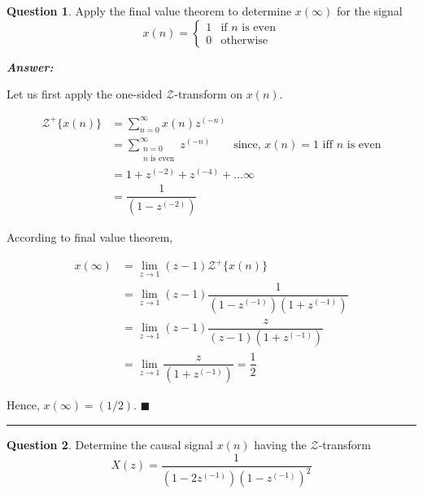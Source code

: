 \documentclass[12pt]{article}
\theoremstyle{definition}
\newtheorem{question}{Question}
\newenvironment{answer}{
    \textbf{\textit{Answer:}} \qquad
}{\hfill $\blacksquare$ \\ 

\begin{center}
    \rule{0.8\linewidth}{1.5px} 
    \vspace*{1cm}   
\end{center}
}
\newcommand{\zcal}{\mathcal{Z}}
\newcommand{\inv}[1][1]{^{(- #1)}}
\begin{document}

\begin{question}
    Apply the final value theorem to determine $x(\infty)$ for the signal 
    $$x(n) = \begin{cases}
        1 & \text{if } n \text{ is even}\\
        0 & \text{otherwise}
    \end{cases}$$
\end{question}

\begin{answer}
    Let us first apply the one-sided $\zcal$-transform on $x(n)$.

    \begin{align*}
        \zcal^+\{ x(n) \}
        & = \sum_{n = 0}^\infty x(n) z\inv[n]\\
        & = \sum_{\substack{n = 0 \\ n \text{ is even}}}^\infty z\inv[n] \qquad \text{since, } x(n) = 1 \text{ iff } n \text{ is even}\\
        & = 1 + z\inv[2] + z\inv[4] + \ldots \infty\\
        & = \dfrac{1}{(1 - z\inv[2])}
    \end{align*}

    According to final value theorem,

    \begin{align*}
        x(\infty)
        & = \lim_{z \rightarrow 1} (z - 1) \zcal^+ \{ x(n)\}\\
        & = \lim_{z \rightarrow 1} (z - 1) \dfrac{1}{(1 - z\inv)(1 + z\inv)}\\
        & = \lim_{z \rightarrow 1} (z - 1) \dfrac{z}{(z - 1)(1 + z\inv)}\\
        & = \lim_{z \rightarrow 1} \dfrac{z}{(1 + z\inv)}=  \dfrac{1}{2}
    \end{align*}

    Hence, $x(\infty) = (1/2)$.
\end{answer}

\begin{question}
    Determine the causal signal $x(n)$ having the $\zcal$-transform 
    $$
    X(z) = \dfrac{1}{(1 - 2z^{(-1)})(1 - z^{(-1)})^2}
    $$
\end{question}
\end{document}
